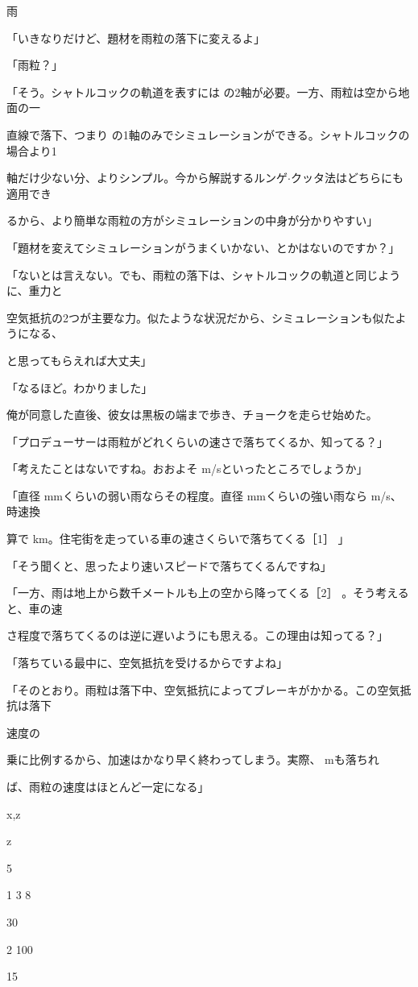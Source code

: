 ⾬\par
「いきなりだけど、題材を⾬粒の落下に変えるよ」\par
「⾬粒？」\par
「そう。シャトルコックの軌道を表すには の2軸が必要。⼀⽅、⾬粒は空から地⾯の⼀\par
直線で落下、つまり の1軸のみでシミュレーションができる。シャトルコックの場合より1\par
軸だけ少ない分、よりシンプル。今から解説するルンゲ$\cdot$クッタ法はどちらにも適⽤でき\par
るから、より簡単な⾬粒の⽅がシミュレーションの中⾝が分かりやすい」\par
「題材を変えてシミュレーションがうまくいかない、とかはないのですか？」\par
「ないとは⾔えない。でも、⾬粒の落下は、シャトルコックの軌道と同じように、重⼒と\par
空気抵抗の2つが主要な⼒。似たような状況だから、シミュレーションも似たようになる、\par
と思ってもらえれば⼤丈夫」\par
「なるほど。わかりました」\par
俺が同意した直後、彼⼥は黒板の端まで歩き、チョークを⾛らせ始めた。\par
「プロデューサーは⾬粒がどれくらいの速さで落ちてくるか、知ってる？」\par
「考えたことはないですね。おおよそ  m/sといったところでしょうか」\par
「直径  mmくらいの弱い⾬ならその程度。直径  mmくらいの強い⾬なら  m/s、時速換\par
算で  km。住宅街を⾛っている⾞の速さくらいで落ちてくる［1］ 」\par
「そう聞くと、思ったより速いスピードで落ちてくるんですね」\par
「⼀⽅、⾬は地上から数千メートルも上の空から降ってくる［2］ 。そう考えると、⾞の速\par
さ程度で落ちてくるのは逆に遅いようにも思える。この理由は知ってる？」\par
「落ちている最中に、空気抵抗を受けるからですよね」\par
「そのとおり。⾬粒は落下中、空気抵抗によってブレーキがかかる。この空気抵抗は落下\par
速度の\par
乗に⽐例するから、加速はかなり早く終わってしまう。実際、  mも落ちれ\par
ば、⾬粒の速度はほとんど⼀定になる」\par
x,z\par
z\par
5\par
1 3 8\par
30\par
2 100\par
15\par

